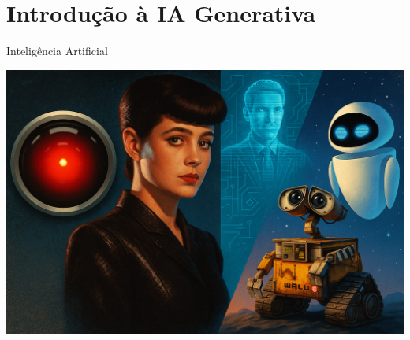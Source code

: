 \documentclass[aspectratio=169,12pt]{beamer}
\begin{document}

\section{Introdução à IA Generativa}

\begin{frame}{Inteligência Artificial}
    \begin{center}
        
\includegraphics[scale=0.2]{diferentesia.png}
    \end{center}
\end{frame}
\end{document}
